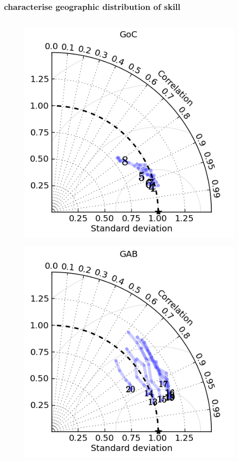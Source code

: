 \begin{frame}
\frametitle{characterise geographic distribution of skill}
\begin{columns}
    \begin{column}{0.3\textwidth}
      \begin{figure}      
        \includegraphics[width=\textwidth]{figures/plots/taylor_diag_res_GoC.png}
      \end{figure}
      \begin{figure}      
        \includegraphics[width=\textwidth]{figures/plots/taylor_diag_res_GAB.png}

\end{figure}
\end{column}
\end{columns}
\end{frame}
